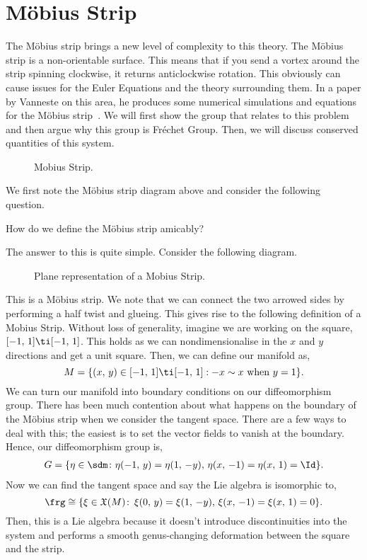 
\section{M\"{o}bius Strip}

The M\"obius strip brings a new level of complexity to this theory. The M\"obius strip is a non-orientable surface. This means that if you send a vortex around the strip spinning clockwise, it returns anticlockwise rotation. This obviously can cause issues for the Euler Equations and the theory surrounding them. In a paper by Vanneste on this area, he produces some numerical simulations and equations for the M\"obius strip~\cite{vanneste_2021}. We will first show the group that relates to this problem and then argue why this group is Fr\'echet Group. Then, we will discuss conserved quantities of this system.

\begin{figure}[!ht]
\centering
\resizebox{0.45\textwidth}{!}{}
\caption{Mobius Strip.}
\label{fig:mobius}
\end{figure}

\noindent
We first note the M\"obius strip diagram above and consider the following question.
\begin{question}
  How do we define the M\"obius strip amicably?
\end{question}
\noindent
The answer to this is quite simple. Consider the following diagram.

\begin{figure}[!ht]
\centering
\resizebox{0.35\textwidth}{!}{}
\caption{Plane representation of a Mobius Strip.}
\label{fig:mobius}
\end{figure}

\noindent
This is a M\"obius strip. We note that we can connect the two arrowed sides by performing a half twist and glueing. This gives rise to the following definition of a Mobius Strip. Without loss of generality, imagine we are working on the square, $[-1,\,1]\ti[-1,\,1]$. This holds as we can nondimensionalise in the $x$ and $y$ directions and get a unit square. Then, we can define our manifold as,
$$ M = \{(x,\,y) \in [-1,\,1]\ti[-1,\,1] : -x \sim x \text{ when } y = 1\}. $$
We can turn our manifold into boundary conditions on our diffeomorphism group. There has been much contention about what happens on the boundary of the M\"obius strip when we consider the tangent space. There are a few ways to deal with this; the easiest is to set the vector fields to vanish at the boundary. Hence, our diffeomorphism group is,
\begin{align*}
  G = \{\eta \in\sdm  \colon \eta(-1,\,y) = \eta(1,\, -y),\, \eta(x,\,-1) = \eta(x,\,1) = \Id\}.
\end{align*}
\noindent
Now we can find the tangent space and say the Lie algebra is isomorphic to,
$$ \frg \cong \{\xi \in \mathfrak{X}(M)\colon\, \xi(0,\,y) = \xi(1,\,-y),\, \xi(x,\,-1) = \xi(x,\, 1) = 0\}. $$
Then, this is a Lie algebra because it doesn't introduce discontinuities into the system and performs a smooth genus-changing deformation between the square and the strip.\\


